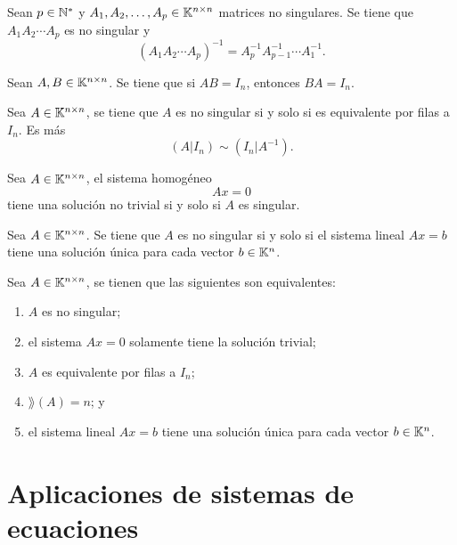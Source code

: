 \documentclass[a4,11pt]{aleph-notas}
\begin{document}
\begin{teo}
    Sean $p\in\N^*$ y $A_1, A_2, \ldots, A_p \in \Mat[\K]{n}{n}$ matrices no singulares. Se tiene que $A_1 A_2 \cdots A_p$ es no singular y 
    \[
        (A_1 A_2 \cdots A_p)^{-1} = A_p^{-1} A_{p-1}^{-1} \cdots A_1^{-1}.
    \]
\end{teo}

\begin{teo}
    Sean $A, B \in \Mat[\K]{n}{n}$. Se tiene que si $AB=I_n$, entonces $BA=I_n$.
\end{teo}

\begin{teo}
    Sea $A \in \Mat[\K]{n}{n}$, se tiene que $A$ es no singular si y solo si es equivalente por filas a $I_n$. Es más
    \[
        (A|I_n) \sim (I_n|A^{-1}).
    \]
\end{teo}

\begin{teo}
    Sea $A \in \Mat[\K]{n}{n}$, el sistema homogéneo 
    \[
        Ax = 0
    \]
    tiene una solución no trivial si y solo si $A$ es singular. 
\end{teo}

\begin{teo}
    Sea $A \in \Mat[\K]{n}{n}$. Se tiene que $A$ es no singular si y solo si el sistema lineal $Ax=b$ tiene una solución única para cada vector $b \in \K^{n}$.
\end{teo}

\begin{teo}
    Sea $A \in \Mat[\K]{n}{n}$, se tienen que las siguientes son equivalentes:
    \begin{enumerate}
    \item 
        $A$ es no singular;
    \item 
        el sistema $Ax=0$ solamente tiene la solución trivial;
    \item 
        $A$ es equivalente por filas a $I_n$;
    \item 
        $\rang(A)=n$; y 
    \item 
        el sistema lineal $Ax=b$ tiene una solución única para cada vector $b \in \K^{n}$. 
    \end{enumerate}
\end{teo}

\section{Aplicaciones de sistemas de ecuaciones}
\end{document}
